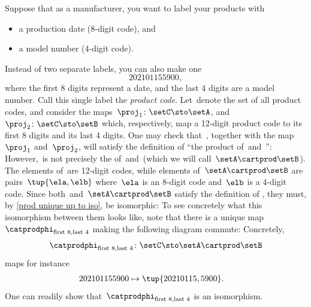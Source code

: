 \begin{example}
    \label{exa:univ-prop-prod}
    Suppose that as a manufacturer, you want to label your products with
    \begin{itemize}
        \item a production date (8-digit code), and
        \item a model number (4-digit code).
    \end{itemize}
    Instead of two separate labels, you can also make one
    \begin{equation}
        \label{eq:exa-prod-univ-prop-code}
        202101155900,
    \end{equation}
    where the first 8 digits represent a date, and the last 4 digits are a model number.
    Call this single label the \emph{product code}.
    Let~\setC denote the set of all product codes, and consider the maps~$\proj_1\colon \setC \sto \setA$, and~$\proj_2\colon \setC \sto \setB$ which, respectively, map a 12-digit product code to its first 8 digits and its last 4 digits.
    One may check that~\setC, together with the map~$\proj_1$ and~$\proj_2$, will satisfy the definition of ``the product of~\setA and~\setB'':
    However,~\setC is not precisely the  of~\setA and~\setB (which we will call~$\setA\cartprod \setB$).
    The elements of~\setC are 12-digit codes, while elements of~$\setA\cartprod \setB$ are pairs~$\tup{\ela,\elb}$ where~$\ela$ is an 8-digit code and~$\elb$ is a 4-digit code.
    Since both~\setC and~$\setA\cartprod \setB$ satisfy the definition of , they must, by \cref{prod unique up to iso}, be isomorphic:
    To see concretely what this isomorphism between them looks like, note that there is a unique map $\catprodphi_{\text{first 8},\text{last 4}}$ making the following diagram commute: %
    Concretely,
    \begin{equation}
        \label{eq:exa-univ-iso}
        \catprodphi_{\text{first 8},\text{last 4}}\colon \setC \sto \setA\cartprod \setB
    \end{equation}
    maps for instance
    \begin{equation}
        \label{eq:exa-univ-iso-concrete}
        \begin{aligned}
            202101155900 & \mapsto \tup{20210115,5900}.
        \end{aligned}
    \end{equation}
    One can readily show that~$\catprodphi_{\text{first 8},\text{last 4}}$ is an isomorphism.
\end{example}

